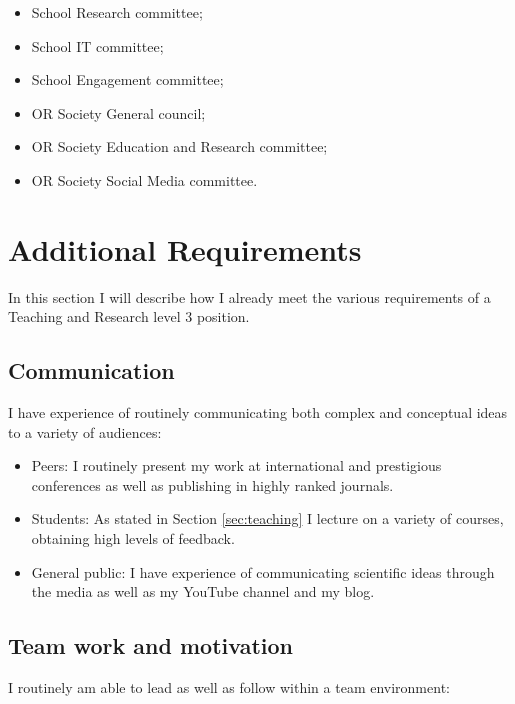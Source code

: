 \documentclass{article}
\begin{document}
\begin{itemize}
    \item School Research committee;
    \item School IT committee;
    \item School Engagement committee;
    \item OR Society General council;
    \item OR Society Education and Research committee;
    \item OR Society Social Media committee.
\end{itemize}

\section{Additional Requirements}\label{sec:additional}

In this section I will describe how I already meet the various requirements of a Teaching and Research level 3 position.

\subsection{Communication}

I have experience of routinely communicating both complex and conceptual ideas to a variety of audiences:

\begin{itemize}
    \item Peers: I routinely present my work at international and prestigious conferences as well as publishing in highly ranked journals.
    \item Students: As stated in Section \ref{sec:teaching} I lecture on a variety of courses, obtaining high levels of feedback.
    \item General public: I have experience of communicating scientific ideas through the media as well as my YouTube channel and my blog.
\end{itemize}

\subsection{Team work and motivation}

I routinely am able to lead as well as follow within a team environment:
\end{document}
